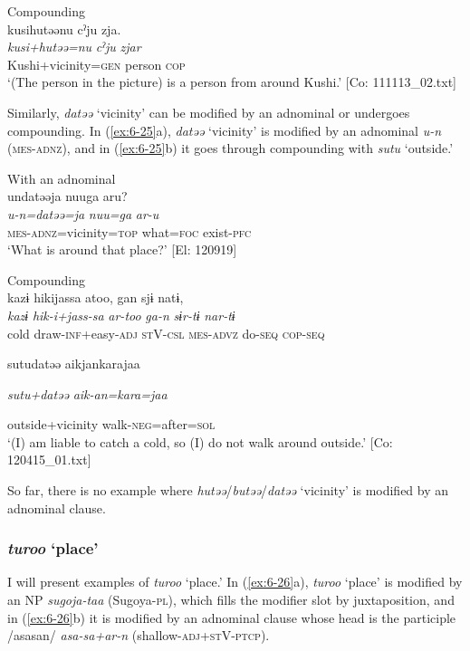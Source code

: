 \ex Compounding\\
{\TM}
\glll  kusihutəənu  cˀju  zja.\\
\textit{kusi+hutəə=nu}  \textit{cˀju}  \textit{zjar}\\
Kushi+vicinity=\textsc{gen}  person  \textsc{cop}\\
\glt ‘(The person in the picture) is a person from around Kushi.’ [Co: 111113\_02.txt]
\z

Similarly, \textit{datəə} ‘vicinity’ can be modified by an adnominal or undergoes compounding. In (\ref{ex:6-25}a), \textit{datəə} ‘vicinity’ is modified by an adnominal \textit{u-n} (\textsc{mes}-\textsc{adnz}), and in (\ref{ex:6-25}b) it goes through compounding with \textit{sutu} ‘outside.’

\ea\label{ex:6-25}
\ea With an adnominal\\
{\TM}
\glll  undatəəja  nuuga  aru?\\
\textit{u-n=datəə=ja}  \textit{nuu=ga}  \textit{ar-u}\\
\textsc{mes}-\textsc{adnz}=vicinity=\textsc{top}  what=\textsc{foc}  exist-\textsc{pfc}\\
\glt ‘What is around that place?’ [El: 120919]

\ex Compounding\\
{\TM}
\glll  kazɨ  hikijassa  atoo,  gan  sjɨ  natɨ,\\
\textit{kazɨ}  \textit{hik-i+jass-sa}  \textit{ar-too}  \textit{ga-n}  \textit{sɨr-tɨ}  \textit{nar-tɨ}\\
cold  draw-\textsc{inf}+easy-\textsc{adj}  \textsc{st}V-\textsc{csl}  \textsc{mes}-\textsc{advz}  do-\textsc{seq}  \textsc{cop}-\textsc{seq}

      sutudatəə  aikjankarajaa

      \textit{sutu+datəə}  \textit{aik-an=kara=jaa}

      outside+vicinity  walk-\textsc{neg}=after=\textsc{sol}\\
\glt ‘(I) am liable to catch a cold, so (I) do not walk around outside.’ [Co: 120415\_01.txt]
\z

So far, there is no example where \textit{hutəə}/\textit{butəə}/\textit{datəə} ‘vicinity’ is modified by an adnominal clause.

\subsubsection{ \textit{turoo} ‘place’}

I will present examples of \textit{turoo} ‘place.’ In (\ref{ex:6-26}a), \textit{turoo} ‘place’ is modified by an NP \textit{sugoja-taa} (Sugoya-\textsc{pl}), which fills the modifier slot by juxtaposition, and in (\ref{ex:6-26}b) it is modified by an adnominal clause whose head is the participle /asasan/ \textit{asa-sa+ar-n} (shallow-\textsc{adj}+\textsc{st}V-\textsc{ptcp}).

